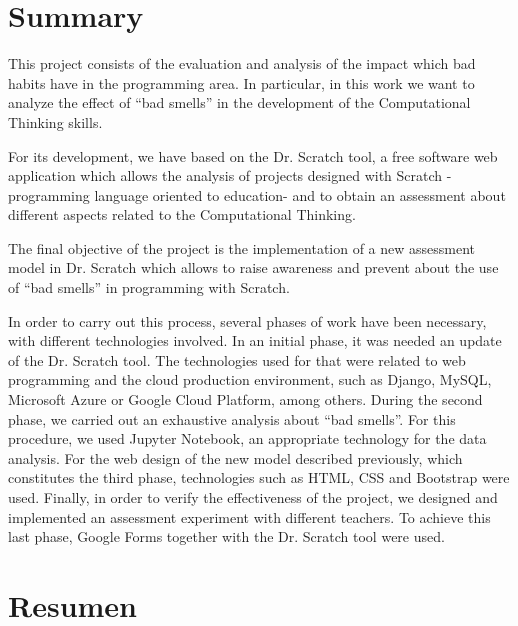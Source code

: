 


\chapter*{Summary}

This project consists of the evaluation and analysis of the impact which bad habits have in the programming area. In particular, in this work we want to analyze the effect of ``bad smells'' in the development of the Computational Thinking skills. 

For its development, we have based on the Dr. Scratch tool, a free software web application which allows the analysis of projects designed with Scratch -programming language oriented to education- and to obtain an assessment about different aspects related to the Computational Thinking.

The final objective of the project is the implementation of a new assessment model in Dr. Scratch which allows to raise awareness and prevent about the use of ``bad smells'' in programming with Scratch.

In order to carry out this process, several phases of work have been necessary, with different technologies involved. In an initial phase, it was needed an update of the Dr. Scratch tool. The technologies used for that were related to web programming and the cloud production environment, such as Django, MySQL, Microsoft Azure or Google Cloud Platform, among others. During the second phase, we carried out an exhaustive analysis about ``bad smells''. For this procedure, we used Jupyter Notebook, an appropriate technology for the data analysis. For the web design of the new model described previously, which constitutes the third phase, technologies such as HTML, CSS and Bootstrap were used. Finally, in order to verify the effectiveness of the project, we designed and implemented an assessment experiment with different teachers. To achieve this last phase, Google Forms together with the Dr. Scratch tool were used.



\chapter*{Resumen}

